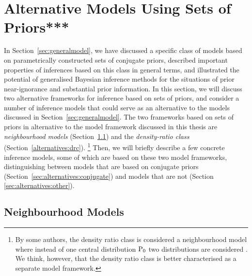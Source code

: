 \section{Alternative Models Using Sets of Priors***}
\label{sec:alternatives}


In Section~\ref{sec:generalmodel},
we have discussed a specific class of models based on parametrically constructed sets of conjugate priors,
described important properties of inferences based on this class in general terms,
and illustrated the potential of generalised Bayesian inference methods
for the situations of prior near-ignorance and substantial prior information.
In this section, we will discuss two alternative frameworks for inference based on sets of priors,
and consider a number of inference models that could serve as an alternative to the models discussed in Section~\ref{sec:generalmodel}.
The two frameworks based on sets of priors
in alternative to the model framework discussed in this thesis are 
\emph{neighbourhood models} (Section~\ref{sec:alternatives:neighbourhood}) and
the \emph{density-ratio class} (Section~\ref{alternatives:drc}).%
\footnote{By some authors, the density ratio class is considered a neighbourhood model
where instead of one central distribution $\operatorname{P}_0$ two distributions are considered
\parencite[e.g.,][\S 4.3]{1991:pericchi}.
We think, however, that the density ratio class is better characterised as a separate model framework.}
Then, we will briefly describe a few concrete inference models,
some of which are based on these two model frameworks,
distinguishing between models that are based on conjugate priors (Section~\ref{sec:alternatives:conjugate})
and models that are not (Section \ref{sec:alternatives:other}).


\subsection{Neighbourhood Models}
\label{sec:alternatives:neighbourhood}

